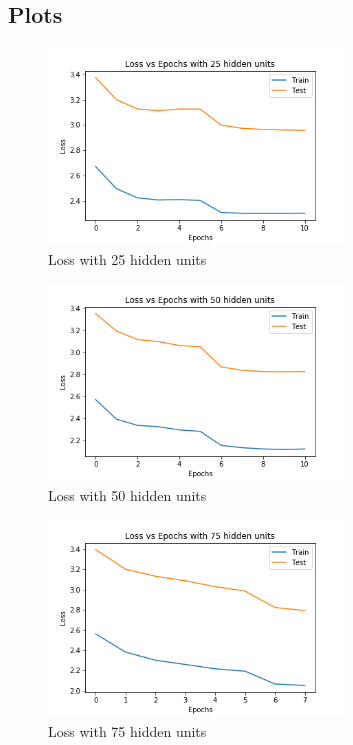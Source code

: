 \documentclass{article}
\begin{document}
\subsection{Plots}
\begin{figure}[h]
\centering
\includegraphics[width=0.7\textwidth]{will/loss_25_units.png}
\caption{Loss with 25 hidden units}
\end{figure}
\begin{figure}[h]
\centering
\includegraphics[width=0.7\textwidth]{will/loss_50_units.png}
\caption{Loss with 50 hidden units}
\end{figure}
\begin{figure}[h]
\centering
\includegraphics[width=0.7\textwidth]{will/loss_75_units.png}
\caption{Loss with 75 hidden units}
\end{figure}
\end{document}
